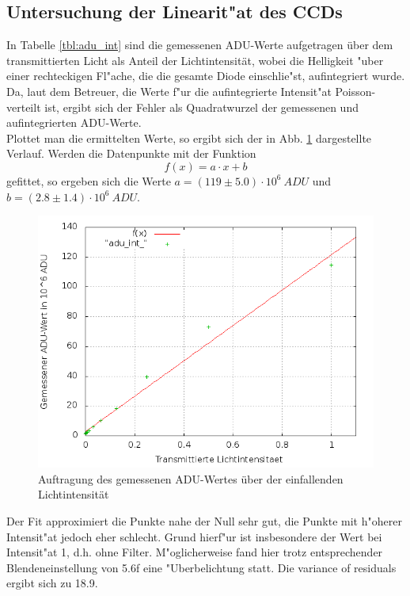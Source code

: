 \subsection{Untersuchung der Linearit"at des CCDs}
In Tabelle \ref{tbl:adu_int} sind die gemessenen ADU-Werte aufgetragen über dem transmittierten Licht als Anteil der Lichtintensität, wobei die Helligkeit "uber einer rechteckigen Fl"ache, die die gesamte Diode einschlie"st, aufintegriert wurde. Da, laut dem Betreuer, die Werte f"ur die aufintegrierte Intensit"at Poisson-verteilt ist, ergibt sich der Fehler als Quadratwurzel der gemessenen und aufintegrierten ADU-Werte. \\
Plottet man die ermittelten Werte, so ergibt sich der in Abb. \ref{plot:adu_int} dargestellte Verlauf. Werden die Datenpunkte mit der Funktion 
\begin{equation}
f(x) = a \cdot x + b
\end{equation}
gefittet, so ergeben sich die Werte $a = (119 \pm 5.0) \cdot 10^6 \ ADU$ und $b = (2.8 \pm 1.4) \cdot 10^6 \ ADU$.
\begin{figure}[h!]
\centering
        \includegraphics[width=.9\textwidth]{adu_int_.png}
\caption{ Auftragung des gemessenen ADU-Wertes über der einfallenden Lichtintensität }
\label{plot:adu_int}
\end{figure}
Der Fit approximiert die Punkte nahe der Null sehr gut, die Punkte mit h"oherer Intensit"at jedoch eher schlecht. Grund hierf"ur ist insbesondere der Wert bei Intensit"at 1, d.h. ohne Filter. M"oglicherweise fand hier trotz entsprechender Blendeneinstellung von 5.6f eine "Uberbelichtung statt. Die variance of residuals ergibt sich zu 18.9. \\

